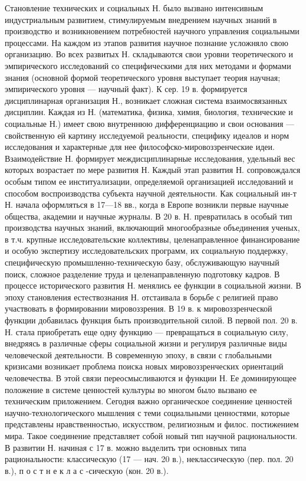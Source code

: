 \documentclass[a4paper,12pt]{article}
\begin{document}
Становление технических и социальных Н. было вызвано интенсивным индустриальным развитием, стимулируемым внедрением научных знаний в производство и возникновением потребностей научного управления социальными процессами. 
На каждом из этапов развития научное познание усложняло свою организацию. Во всех развитых Н. складываются свои уровни теоретического и эмпирического исследований со специфическими для них методами и формами знания (основной формой теоретического уровня выступает теория научная; эмпирического уровня — научный факт). 
К сер. 19 в. формируется дисциплинарная организация Н., возникает сложная система взаимосвязанных дисциплин. Каждая из Н. (математика, физика, химия, биология, технические и социальные Н.) имеет свою внутреннюю дифференциацию и свои основания — свойственную ей картину исследуемой реальности, специфику идеалов и норм исследования и характерные для нее философско-мировоззренческие идеи. 
Взаимодействие Н. формирует междисциплинарные исследования, удельный вес которых возрастает по мере развития Н. 
Каждый этап развития Н. сопровождался особым типом ее институализации, определяемой организацией исследований и способом воспроизводства субъекта научной деятельности. Как социальный ин-т Н. начала оформляться в 17—18 вв., когда в Европе возникли первые научные общества, академии и научные журналы. В 20 в. Н. превратилась в особый тип производства научных знаний, включающий многообразные объединения ученых, в т.ч. крупные исследовательские коллективы, целенаправленное финансирование и особую экспертизу исследовательских программ, их социальную поддержку, специфическую промышленно-техническую базу, обслуживающую научный поиск, сложное разделение труда и целенаправленную подготовку кадров. 
В процессе исторического развития Н. менялись ее функции в социальной жизни. В эпоху становления естествознания Н. отстаивала в борьбе с религией право участвовать в формировании мировоззрения. В 19 в. к мировоззренческой функции добавилась функция быть производительной силой. В первой пол. 20 в. Н. стала приобретать еще одну функцию — превращаться в социальную силу, внедряясь в различные сферы социальной жизни и регулируя различные виды человеческой деятельности. 
В современную эпоху, в связи с глобальными кризисами возникает проблема поиска новых мировоззренческих ориентаций человечества. В этой связи переосмысливаются и функции Н. Ее доминирующее положение в системе ценностей культуры во многом было вызвано ее техническим приложением. Сегодня важно органическое соединение ценностей научно-технологического мышления с теми социальными ценностями, которые представлены нравственностью, искусством, религиозным и филос. постижением мира. Такое соединение представляет собой новый тип научной рациональности. В развитии Н. начиная с 17 в. можно выделить три основных типа рациональности: классическую (17 — нач. 20 в.), неклассическую (пер. пол. 20 в.), п о с т н е к л а с -сическую (кон. 20 в.). 
\end{document}
